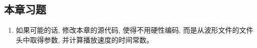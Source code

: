 \documentclass[12pt]{article}
\begin{document}
\begin{CJK}{UTF8}{gbsn}
\subsection{本章习题}
\begin{enumerate}
\item 如果可能的话, 修改本章的源代码, 使得不用硬性编码, 而是从波形文件的文件头中取得参数, 并计算播放速度的时间常数。
\end{enumerate}




\end{CJK}
\end{document}
